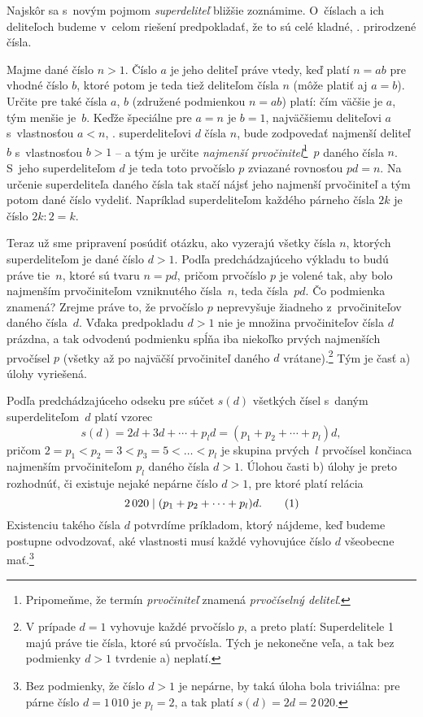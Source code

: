 {%
Najskôr sa s~novým pojmom {\it superdeliteľ\/} bližšie zoznámime.
O~číslach a ich deliteľoch budeme v~celom riešení
predpokladať, že to sú celé kladné, \tj. prirodzené čísla.

Majme dané číslo $n>1$. Číslo $a$ je jeho deliteľ
práve vtedy, keď platí $n=ab$ pre vhodné číslo $b$,
ktoré potom je teda tiež deliteľom čísla $n$ (môže platiť
aj $a=b$). Určite pre také čísla $a$, $b$
(združené podmienkou $n=ab$) platí: čím väčšie je $a$,
tým menšie je~$b$. Keďže špeciálne
pre $a=n$ je $b=1$, najväčšiemu deliteľovi $a$
s~vlastnosťou $a<n$, \tj. superdeliteľovi $d$ čísla $n$,
bude zodpovedať najmenší deliteľ $b$ s~vlastnosťou $b>1$ --
a tým je určite {\it najmenší
prvočiniteľ}\footnote{Pripomeňme, že termín {\it
prvočiniteľ\/} znamená {\it prvočíselný deliteľ}.}~$p$ daného čísla $n$. S~jeho superdeliteľom $d$ je teda toto
prvočíslo $p$ zviazané rovnosťou $pd=n$. Na určenie superdeliteľa daného čísla
tak stačí nájsť jeho najmenší prvočiniteľ a tým potom dané číslo vydeliť.
Napríklad superdeliteľom každého párneho čísla $2k$ je číslo $2k:2=k$.

Teraz už sme pripravení posúdiť otázku, ako vyzerajú všetky
čísla $n$, ktorých superdeliteľom je dané číslo $d>1$. Podľa
predchádzajúceho výkladu to budú práve tie~$n$, ktoré sú tvaru
$n=pd$, pričom prvočíslo $p$ je volené tak, aby bolo
najmenším prvočiniteľom vzniknutého čísla~$n$, teda čísla~$pd$.
Čo podmienka  znamená?
Zrejme práve to, že prvočíslo $p$ neprevyšuje žiadneho
z~prvočiniteľov daného čísla~$d$. Vďaka
predpokladu $d>1$ nie je množina prvočiniteľov čísla $d$
prázdna,
a tak odvodenú podmienku spĺňa iba niekoľko prvých najmenších
prvočísel $p$ (všetky až po najväčší prvočiniteľ daného $d$
vrátane).\footnote{V prípade $d=1$ vyhovuje každé prvočíslo $p$,
a preto platí: Superdelitele 1 majú práve tie čísla,
ktoré sú prvočísla. Tých je nekonečne veľa, a tak bez
podmienky $d>1$ tvrdenie a) neplatí.}
Tým je časť a) úlohy vyriešená.

Podľa predchádzajúceho odseku pre súčet $s(d)$ všetkých čísel s~daným
superdeliteľom~$d$ platí vzorec
$$
s(d)=2d+3d+\cdots+p_ld=
(p_1+p_2+\cdots+p_l)d,
$$
pričom $2\!=\!p_1\!<\!p_2\!=\!3\!<\!p_3\!=\!5\!<\!\ldots\!<\!p_l$
je skupina prvých~$l$ prvočísel končiaca
najmenším prvočiniteľom $p_l$ daného čísla $d>1$. Úlohou časti
b) úlohy je preto rozhodnúť, či existuje nejaké nepárne číslo $d>1$,
pre ktoré platí relácia
$$
2\,020\mid(p_1+p_2+\cdots+p_l)d.
\tag1
$$
Existenciu takého čísla $d$ potvrdíme príkladom, ktorý nájdeme,
keď budeme postupne odvodzovať, aké vlastnosti musí každé
vyhovujúce číslo $d$ všeobecne mať.\footnote{Bez podmienky, že číslo
$d>1$ je nepárne, by taká úloha bola triviálna:
pre párne číslo $d=1\,010$ je $p_l=2$, a tak platí $s(d)=2d=2\,020$.}

}
